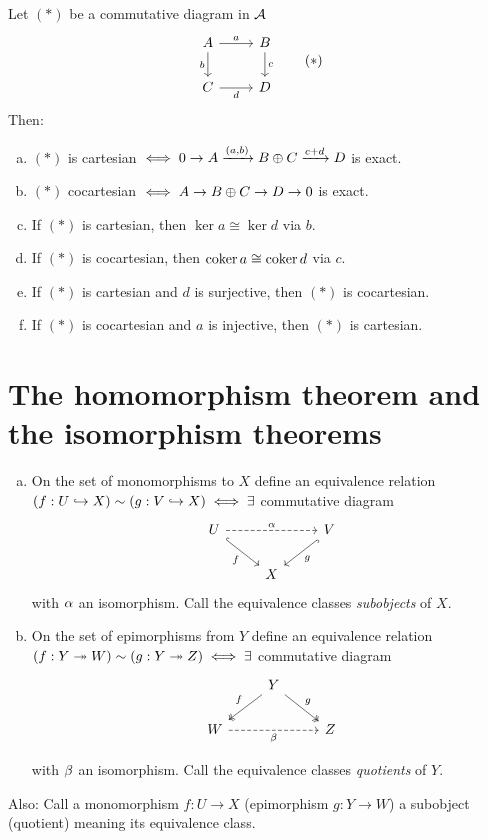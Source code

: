 \documentclass[a4paper]{report}
\begin{document}
\begin{lemm}
  Let $(*)$ be a commutative diagram in $\mathcal{A}$
  \[\begin{tikzcd}
      A \arrow[r, "a"] \arrow[d, "b"'] & B \arrow[d, "c"] \\
      C \arrow[r, "d"']& D
    \end{tikzcd} \quad \quad (*)\]
  Then:
  \begin{enumerate}[(a)]
    \item $(*)$ is cartesian $\iff 0 \to A \xrightarrow{(a,b)} B \oplus C \xrightarrow{c + d} D$ is exact.
    \item $(*)$ cocartesian $\iff A \to B \oplus C \to D \to 0$ is exact.
    \item If $(*)$ is cartesian, then $\ker a \cong \ker d$ via $b$.
    \item If $(*)$ is cocartesian, then $\operatorname{coker} a \cong \operatorname{coker} d$ via $c$.
          \item If $(*)$ is cartesian and $d$ is surjective, then $(*)$ is cocartesian.
          \item If $(*)$ is cocartesian and $a$ is injective, then $(*)$ is cartesian.
  \end{enumerate}

\end{lemm}
\section{The homomorphism theorem and the isomorphism theorems}
\begin{defi}
\begin{enumerate}[(a)]
  \item On the set of monomorphisms to $X$ define an equivalence relation $(f: U \hookrightarrow X) \sim (g: V \hookrightarrow X) \iff \exists$ commutative diagram
        \[\begin{tikzcd}
U \arrow[rd, "f"', hook] \arrow[rr, "\alpha", dashed] &   & V \arrow[ld, "g", hook] \\
                                                      & X &
\end{tikzcd}\]
with $\alpha$ an isomorphism. Call the equivalence classes \emph{subobjects} of $X$.
  \item On the set of epimorphisms from $Y$ define an equivalence relation $(f: Y \twoheadrightarrow W) \sim (g: Y \twoheadrightarrow Z) \iff \exists$ commutative diagram
\[\begin{tikzcd}
                              & Y \arrow[ld, two heads, "f"'] \arrow[rd, two heads, "g"] &   \\
W \arrow[rr, "\beta"', dashed] &                                    & Z
\end{tikzcd}\]

        with $\beta$ an isomorphism. Call the equivalence classes \emph{quotients} of $Y$.
\end{enumerate}
Also: Call a monomorphism $f: U \to X$ (epimorphism $g: Y \to W$) a subobject (quotient) meaning its equivalence class.
\end{defi}
\end{document}
